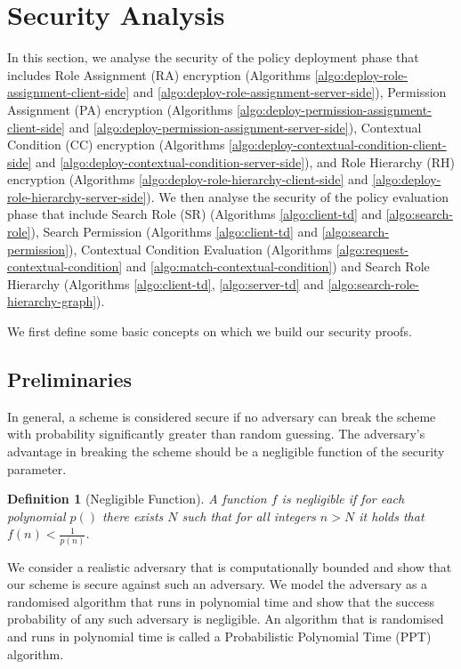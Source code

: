 \documentclass[final,5p,times,twocolumn]{elsarticle}
\newtheorem{definition}{Definition}
\begin{document}
\section{Security Analysis}
\label{sec:security-analysis} 
In this section, we analyse the security of the policy deployment phase that includes Role Assignment (RA) encryption (Algorithms \ref{algo:deploy-role-assignment-client-side} and \ref{algo:deploy-role-assignment-server-side}), Permission Assignment (PA) encryption (Algorithms \ref{algo:deploy-permission-assignment-client-side} and \ref{algo:deploy-permission-assignment-server-side}), Contextual Condition (CC) encryption (Algorithms \ref{algo:deploy-contextual-condition-client-side} and \ref{algo:deploy-contextual-condition-server-side}), and Role Hierarchy (RH) encryption (Algorithms \ref{algo:deploy-role-hierarchy-client-side} and \ref{algo:deploy-role-hierarchy-server-side}). We then analyse the security of the policy evaluation phase that include Search Role (SR) (Algorithms \ref{algo:client-td} and \ref{algo:search-role}), Search Permission (Algorithms \ref{algo:client-td} and \ref{algo:search-permission}), Contextual Condition Evaluation (Algorithms \ref{algo:request-contextual-condition} and \ref{algo:match-contextual-condition}) and Search Role Hierarchy (Algorithms \ref{algo:client-td}, \ref{algo:server-td} and \ref{algo:search-role-hierarchy-graph}). 

We first define some basic concepts on which we build our security proofs.

\subsection{Preliminaries}
In general, a scheme is considered secure if no adversary can break the scheme with probability significantly greater than random guessing. The adversary's advantage in breaking the scheme should be a negligible function of the security parameter.

\begin{definition}[Negligible Function]
A function $f$ is negligible if for each polynomial $p()$ there exists $N$ such that for all integers $n > N$ it holds that $f(n)<\frac{1}{p(n)}$.
\end{definition}

We consider a realistic adversary that is computationally bounded and show that our scheme is secure against such an adversary. We model the adversary as a randomised algorithm that runs in polynomial time and show that the success probability of any such adversary is negligible. An algorithm that is randomised and runs in polynomial time is
called a Probabilistic Polynomial Time (PPT) algorithm.
\end{document}
